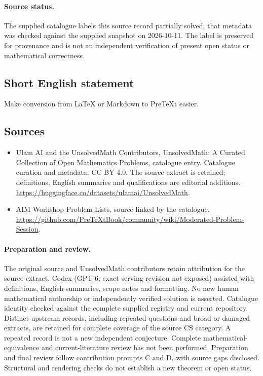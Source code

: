 \documentclass[11pt]{article}
\begin{document}
\paragraph{Source status.}
The supplied catalogue labels this source record partially solved; that metadata was checked against the supplied snapshot on 2026-10-11. The label is preserved for provenance and is not an independent verification of present open status or mathematical correctness.
\subsection{Short English statement}
Make conversion from LaTeX or Markdown to PreTeXt easier.
\subsection{Sources}
\begin{itemize}
\item[\hypertarget{source:statement:1}{S1}] Ulam AI and the UnsolvedMath Contributors, UnsolvedMath: A Curated Collection of Open Mathematics Problems, catalogue entry. Catalogue curation and metadata: CC BY 4.0. The source extract is retained; definitions, English summaries and qualifications are editorial additions.
\url{https://huggingface.co/datasets/ulamai/UnsolvedMath}.
\item[\hypertarget{source:statement:2}{S2}] AIM Workshop Problem Lists, source linked by the catalogue.
\url{https://github.com/PreTeXtBook/community/wiki/Moderated-Problem-Session}.
\end{itemize}
\paragraph{Preparation and review.}
The original source and UnsolvedMath contributors retain attribution for the source extract. Codex (GPT-6; exact serving revision not exposed) assisted with definitions, English summaries, scope notes and formatting. No new human mathematical authorship or independently verified solution is asserted. Catalogue identity checked against the complete supplied registry and current repository. Distinct upstream records, including repeated questions and broad or damaged extracts, are retained for complete coverage of the source CS category. A repeated record is not a new independent conjecture. Complete mathematical-equivalence and current-literature review has not been performed. Preparation and final review follow contribution prompts C and D, with source gaps disclosed. Structural and rendering checks do not establish a new theorem or open status.
\label{end:statement}
\end{document}
